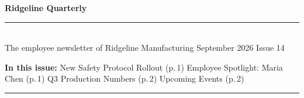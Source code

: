 \documentclass[10pt]{article}
\begin{document}
\begin{center}
  {\color{masthead}\Huge\bfseries Ridgeline Quarterly}\\[2pt]
  {\color{rule}\rule{\linewidth}{2pt}}\\[4pt]
  {\small\color{gray} The employee newsletter of Ridgeline Manufacturing
    \quad\textbullet\quad September 2026 \quad\textbullet\quad Issue 14}
\end{center}

\vspace{0.6em}

\noindent\textbf{In this issue:} New Safety Protocol Rollout (p.\,1)
\quad\textbullet\quad Employee Spotlight: Maria Chen (p.\,1)
\quad\textbullet\quad Q3 Production Numbers (p.\,2)
\quad\textbullet\quad Upcoming Events (p.\,2)

\vspace{0.8em}
\hrule
\vspace{0.8em}
\end{document}
